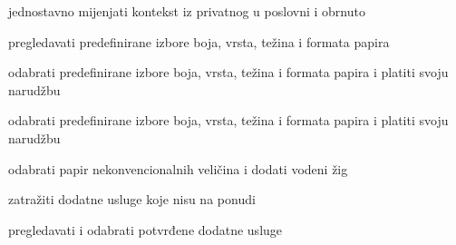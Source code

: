 			
			\begin{packed_enum}
				\item  {}
				
				\begin{packed_enum}
					
					\item jednostavno mijenjati  kontekst  iz  privatnog  u  poslovni  i  obrnuto
					\item pregledavati predefinirane izbore boja, vrsta, težina i formata papira
						
				
					
				\end{packed_enum}
			
				\item  {}
				
				\begin{packed_enum}
					
					\item odabrati predefinirane izbore boja, vrsta, težina i formata papira i platiti svoju narudžbu
					
				\end{packed_enum}
			
				\item  {}
				
				\begin{packed_enum}
					
					\item odabrati predefinirane izbore boja, vrsta, težina i formata papira i platiti svoju narudžbu
					
					\item odabrati papir nekonvencionalnih veličina i dodati vodeni žig
					
					\item zatražiti dodatne usluge koje nisu na ponudi
					
					\item  pregledavati i odabrati potvrđene dodatne usluge
					

\end{packed_enum}
\end{packed_enum}
